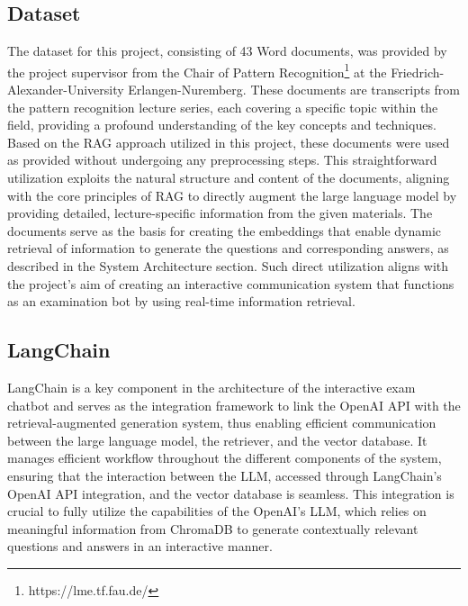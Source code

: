 \documentclass{article}
\begin{document}
\subsection{Dataset}
The dataset for this project, consisting of 43 Word documents, was provided by the project supervisor from the Chair of Pattern Recognition\footnote{https://lme.tf.fau.de/} at the Friedrich-Alexander-University Erlangen-Nuremberg. These documents are transcripts from the pattern recognition lecture series, each covering a specific topic within the field, providing a profound understanding of the key concepts and techniques. Based on the RAG approach utilized in this project, these documents were used as provided without undergoing any preprocessing steps. This straightforward utilization exploits the natural structure and content of the documents, aligning with the core principles of RAG to directly augment the large language model by providing detailed, lecture-specific information from the given materials.
\newline
The documents serve as the basis for creating the embeddings that enable dynamic retrieval of information to generate the questions and corresponding answers, as described in the System Architecture section. Such direct utilization aligns with the project's aim of creating an interactive communication system that functions as an examination bot by using real-time information retrieval.
\subsection{LangChain}
LangChain is a key component in the architecture of the interactive exam chatbot and serves as the integration framework to link the OpenAI API with the retrieval-augmented generation system, thus enabling efficient communication between the large language model, the retriever, and the vector database. It manages efficient workflow throughout the different components of the system, ensuring that the interaction between the LLM, accessed through LangChain's OpenAI API integration, and the vector database is seamless. This integration is crucial to fully utilize the capabilities of the OpenAI's LLM, which relies on meaningful information from ChromaDB to generate contextually relevant questions and answers in an interactive manner.
\end{document}
